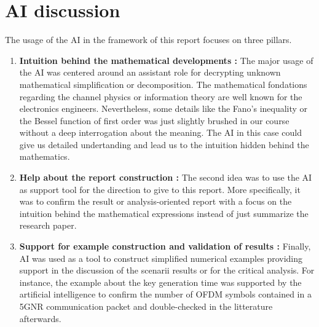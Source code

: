 \chapter{AI discussion}

The usage of the AI in the framework of this report focuses on three pillars.

\begin{enumerate}
    \item \textbf{Intuition behind the mathematical developments : }The major usage of the AI was centered around an assistant role for decrypting unknown mathematical simplification or decomposition.  The mathematical fondations regarding the channel physics or information theory are well known for the electronics engineers.  Nevertheless, some details like the Fano's inequality or the Bessel function of first order was just slightly brushed in our course without a deep interrogation about the meaning.  The AI in this case could give us detailed undertanding and lead us to the intuition hidden behind the mathematics.
    \item \textbf{Help about the report construction : }The second idea was to use the AI as support tool for the direction to give to this report.  More specifically, it was to confirm the result or analysis-oriented report with a focus on the intuition behind the mathematical expressions instead of just summarize the research paper.
    \item \textbf{Support for example construction and validation of results : } Finally, AI was used as a tool to construct simplified numerical examples providing support in the discussion of the scenarii results or for the critical analysis. For instance, the example about the key generation time was supported by the artificial intelligence to confirm the number of OFDM symbols contained in a 5GNR communication packet and double-checked in the litterature afterwards.
\end{enumerate}



